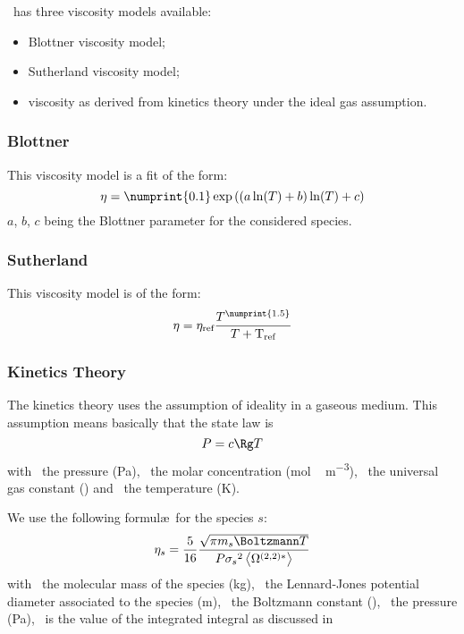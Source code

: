 \Antioch\ has three viscosity models available:
\begin{itemize}
\item Blottner viscosity model;
\item Sutherland viscosity model;
\item viscosity as derived from kinetics theory under the ideal gas assumption.
\end{itemize}

\subsubsection{Blottner}
\label{transport:viscosity:blottner}

This viscosity model is a fit of the form:
\begin{equation}
\vis = \numprint{0.1} \exp\left((a \ln(\Temp) + b) \ln(\Temp) + c\right)
\label{blottner:eq}
\end{equation}
$a$, $b$, $c$ being the Blottner parameter for the considered
species.

\subsubsection{Sutherland}
\label{transport:viscosity:sutherland}

This viscosity model is of the form:
\begin{equation}
\vis = \vis_\text{ref} \frac{\Temp^{\numprint{1.5}}}{\Temp + \text{T}_\text{ref}}
\label{sutherland:eq}
\end{equation}

\subsubsection{Kinetics Theory}
\label{transport:viscosity:kin_theo}

The kinetics theory uses the assumption of ideality in a 
gaseous medium. This assumption means basically that the
state law is
\begin{equation}
\Press = \conc\Rg \Temp
\end{equation}
with \Press\ the pressure (\unit{Pa}), \conc\ the molar concentration
(\unit{mol\,m^{-3}}), \Rg\ the universal gas constant (\RgEquation)
and \Temp\ the temperature (\unit{K}).

We use the following formul\ae\ for the species $s$:
\begin{equation}
\vis[s] = \frac{5}{16} \frac{\sqrt{\pi\Mass[s]\Boltzmann\Temp}}{\Press\LJdia[s]^2\Stockmayer{2}}
\label{visc_kin_theory:eq}
\end{equation}
with \Mass\ the molecular mass of the species (\unit{kg}), \LJdia\ the Lennard-Jones
potential diameter associated to the species (\unit{m}), \Boltzmann\ the Boltzmann
constant (\BoltzmannEquation), \Press\ the pressure (\unit{Pa}), \ is the
value of the integrated integral as discussed in \citet{Monchick1961}

